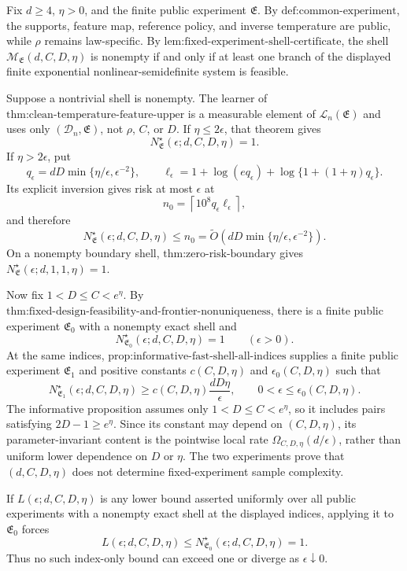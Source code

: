 Fix \(d\ge4\), \(\eta>0\), and the finite public experiment \(\mathfrak E\). By \(\text{def:common-experiment}\), the supports, feature map, reference policy, and inverse temperature are public, while \(\rho\) remains law-specific. By \(\text{lem:fixed-experiment-shell-certificate}\), the shell \(\mathcal M_{\mathfrak E}(d,C,D,\eta)\) is nonempty if and only if at least one branch of the displayed finite exponential nonlinear-semidefinite system is feasible.

Suppose a nontrivial shell is nonempty. The learner of \(\text{thm:clean-temperature-feature-upper}\) is a measurable element of \(\mathcal L_n(\mathfrak E)\) and uses only \((\mathcal D_n,\mathfrak E)\), not \(\rho\), \(C\), or \(D\). If \(\eta\le2\epsilon\), that theorem gives
\[
N^\star_{\mathfrak E}(\epsilon;d,C,D,\eta)=1.
\]
If \(\eta>2\epsilon\), put
\[
q_\epsilon=dD\min\{\eta/\epsilon,\epsilon^{-2}\},
\qquad
\ell_\epsilon=1+\log(eq_\epsilon)+\log\{1+(1+\eta)q_\epsilon\}.
\]
Its explicit inversion gives risk at most \(\epsilon\) at
\[
n_0=\left\lceil10^8q_\epsilon\ell_\epsilon\right\rceil,
\]
and therefore
\[
N^\star_{\mathfrak E}(\epsilon;d,C,D,\eta)
\le n_0
=\widetilde O\!\left(dD\min\{\eta/\epsilon,\epsilon^{-2}\}\right).
\]
On a nonempty boundary shell, \(\text{thm:zero-risk-boundary}\) gives \(N^\star_{\mathfrak E}(\epsilon;d,1,1,\eta)=1\).

Now fix \(1<D\le C<e^\eta\). By \(\text{thm:fixed-design-feasibility-and-frontier-nonuniqueness}\), there is a finite public experiment \(\mathfrak E_0\) with a nonempty exact shell and
\[
N^\star_{\mathfrak E_0}(\epsilon;d,C,D,\eta)=1
\qquad(\epsilon>0).
\]
At the same indices, \(\text{prop:informative-fast-shell-all-indices}\) supplies a finite public experiment \(\mathfrak E_1\) and positive constants \(c(C,D,\eta)\) and \(\epsilon_0(C,D,\eta)\) such that
\[
N^\star_{\mathfrak E_1}(\epsilon;d,C,D,\eta)
\ge c(C,D,\eta)\frac{dD\eta}{\epsilon},
\qquad 0<\epsilon\le\epsilon_0(C,D,\eta).
\]
The informative proposition assumes only \(1<D\le C<e^\eta\), so it includes pairs satisfying \(2D-1\ge e^\eta\). Since its constant may depend on \((C,D,\eta)\), its parameter-invariant content is the pointwise local rate \(\Omega_{C,D,\eta}(d/\epsilon)\), rather than uniform lower dependence on \(D\) or \(\eta\). The two experiments prove that \((d,C,D,\eta)\) does not determine fixed-experiment sample complexity.

If \(L(\epsilon;d,C,D,\eta)\) is any lower bound asserted uniformly over all public experiments with a nonempty exact shell at the displayed indices, applying it to \(\mathfrak E_0\) forces
\[
L(\epsilon;d,C,D,\eta)
\le N^\star_{\mathfrak E_0}(\epsilon;d,C,D,\eta)=1.
\]
Thus no such index-only bound can exceed one or diverge as \(\epsilon\downarrow0\).

